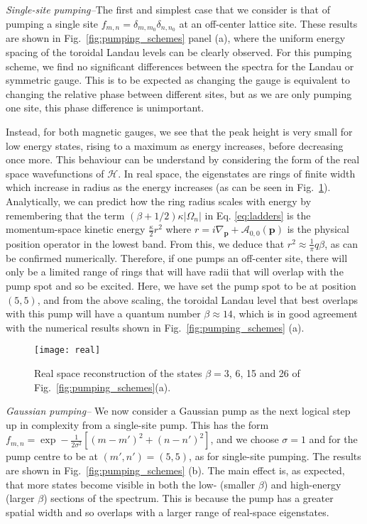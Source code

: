 \documentclass[twocolumn, 10pt, aps, superscriptaddress, floatfix, showpacs, pra, citeautoscript]{revtex4-1}
\begin{document}
{\em{Single-site pumping--}}The first and simplest case that we consider is that of pumping a single site $f_{m,n} = \delta_{m,m_0} \delta_{n,n_0}$ at an off-center lattice site. These results are shown in Fig.~\ref{fig:pumping_schemes} panel (a), where the uniform energy spacing of the toroidal Landau levels can be clearly observed. For this pumping scheme, we find no significant differences between the spectra for the Landau or symmetric gauge. This is to be expected as changing the gauge is equivalent
to changing the relative phase between different sites, but as we are only pumping one site, this phase difference is unimportant.

 Instead, for both magnetic gauges, we see that the peak height is very small for low energy states, rising to a maximum as energy increases, before decreasing once more. This behaviour can be understand by considering the form of the real space wavefunctions of $\mathcal{H}$. 
In real space, the eigenstates are rings of finite width which increase in radius as the energy increases (as can be seen in Fig.~\ref{fig:delta_real_sp}). Analytically, we can predict how the ring radius scales with energy by remembering that the term
$(\beta + 1/2) \kappa |\Omega_n|$ in Eq. \ref{eq:ladders} is the momentum-space kinetic energy
$\frac{\kappa}{2}r^2$ where $r = i\nabla_{\mathbf{p}} + \mathcal{A}_{0, 0}(\mathbf{p})$ is the physical position operator in the lowest band. From this, we deduce that $r^2 \approx \frac{1}{\pi} q \beta$, as can be confirmed numerically. Therefore, if one pumps an off-center site, there will only be a
limited range of rings that will have radii that will overlap with
the pump spot and so be excited. Here, we have set the pump spot to be at position $(5,5)$, and from the above scaling, the toroidal Landau level that best overlaps with this pump will have a quantum number $\beta \approx 14$, which is in good agreement with the numerical results shown in
Fig.~\ref{fig:pumping_schemes} (a). 

\begin{figure}[tb]
  \centering
  \texttt{[image: real]} %
  \caption{Real space reconstruction of the states $\beta=3$, 6, 15
    and 26 of Fig.~\ref{fig:pumping_schemes}(a).}
  \label{fig:delta_real_sp}
\end{figure}

{\em{Gaussian pumping--}} We now consider a Gaussian pump as the next logical step up in complexity from a single-site pump. This has the form $f_{m,n} = \exp- \frac{1}{2\sigma^2} \left[(m-m')^2 + (n-n')^2
\right]$, and we choose $\sigma =1$ and for the pump centre to be at $(m',n') = (5,5)$, as for single-site pumping. The results are shown in Fig.~\ref{fig:pumping_schemes} (b). The main effect is, as expected, that more states
become visible in both the low- (smaller $\beta$) and high-energy (larger $\beta$) sections of the spectrum. This is because the pump has a greater spatial width and so overlaps with a larger range of real-space eigenstates. 
\end{document}
